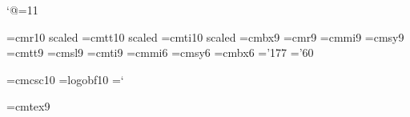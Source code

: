\catcode`@=11 %

\newskip\ttglue

\font\elevenrm=cmr10 scaled \magstephalf %
\font\eleventt=cmtt10 scaled \magstephalf %
\font\elevenit=cmti10 scaled\magstephalf
\font\ninebf=cmbx9
\font\ninerm=cmr9
\font\ninei=cmmi9
\font\ninesy=cmsy9
\font\ninett=cmtt9
\font\ninesl=cmsl9
\font\nineit=cmti9
\font\sixi=cmmi6
\font\sixsy=cmsy6
\font\sixbf=cmbx6
\skewchar\ninei='177 
\skewchar\ninesy='60 
\hyphenchar{} 

\def\ninepoint{\def\rm{\fam0\ninerm}%
 \textfont0=\ninerm \scriptfont0=\sixrm \scriptscriptfont0=\fiverm
 \textfont1=\ninei \scriptfont1=\sixi \scriptscriptfont1=\fivei
 \textfont2=\ninesy \scriptfont2=\sixsy \scriptscriptfont2=\fivesy
 \textfont3=\tenex \scriptfont3=\tenex \scriptscriptfont3=\tenex
 \textfont\itfam=\nineit \def\it{\fam\itfam\nineit}%
 \textfont\slfam=\ninesl \def\sl{\fam\slfam\ninesl}%
 \textfont\bffam=\ninebf \scriptfont\bffam=\sixbf
  \scriptscriptfont\bffam=\fivebf \def\bf{\fam\bffam\ninebf}%
 \textfont\ttfam=\ninett \def\tt{\fam\ttfam\ninett}%
 \tt \ttglue=.5em plus.25em minus.15em
 \normalbaselineskip=11pt
 \setbox\strutbox=\hbox{\vrule height8pt depth3pt width0pt}%
 \let\sc=\sevenrm \normalbaselines\rm}

\font\scaps=cmcsc10 %
\font\lb=logobf10
\chardef\bs=`\\ %
\def\;#1{{\it #1\/}} %


\parindent=1.5pc %

\font\ninetex=cmtex9 \hyphenchar{}
\def\finstring"#1"{\ninetex"#1"\egroup}

\def\Beginmft{\par\begingroup\ninepoint
 \catcode`\:=12 \catcode`\!=12 \catcode`\==12
 \def\mathsemicolon{\mskip\thickmuskip}
 \let\;=\mathsemicolon
 \def\bf{\fam\bffam\ninebf
  \def\_{\kern.04em\vbox{\hrule width.3em height .6pt}\kern.08em}%
  \ninebf}
 \textfont\bffam=\ninebf \scriptfont\bffam=\sixbf
  \scriptscriptfont\bffam=\fivebf
 \baselineskip=11pt
 \def\MF{{\manual hijk}\-{\manual lmnj}}
 \let\big=\ninebig
 \setbox\strutbox=\hbox{\vrule height8pt depth3pt width0pt}
 \rm
 \setbox\shorthyf=\hbox{-\kern-.05em}
 \parindent=0pt
 }
\def\Endmft{\par
     \endgroup} 

